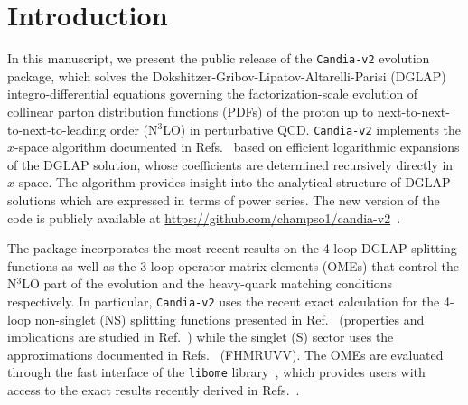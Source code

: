 \documentclass[preprint,12pt]{elsarticle}
\begin{document}
\pagebreak
\tableofcontents
\pagebreak


\section{Introduction}
\label{sec:intro}
In this manuscript, we present the public release of the \texttt{Candia-v2} evolution package, which solves the Dokshitzer-Gribov-Lipatov-Altarelli-Parisi (DGLAP)~\cite{Gribov:1972rt,Gribov:1972ri,Lipatov:1974qm,Dokshitzer:1977sg,Altarelli:1977zs} integro-differential equations governing the factorization-scale evolution of collinear parton distribution functions (PDFs) of the proton up to next-to-next-to-next-to-leading order (N$^3$LO) in perturbative QCD. 
%
\texttt{Candia-v2} implements the $x$-space algorithm documented in Refs.~\cite{Hampson:2025pvi,Cafarella:2005zj,Guzzi:2006wx,Cafarella:2008du} based on efficient logarithmic expansions of the DGLAP solution, whose coefficients are determined recursively directly in $x$-space. The algorithm provides insight into the analytical structure of DGLAP solutions which are expressed in terms of power series. The new version of the code is publicly available at \url{https://github.com/champso1/candia-v2}~\cite{candiav2}.

The package incorporates the most recent results on the 4-loop DGLAP splitting functions as well as the 3-loop operator matrix elements (OMEs) that control the N$^3$LO part of the evolution and the heavy-quark matching conditions respectively. In particular, \texttt{Candia-v2} uses the recent exact calculation for the 4-loop non-singlet (NS) splitting functions presented in Ref.~\cite{Gehrmann:2026qbl} (properties and implications are studied in Ref.~\cite{Moch:2026qsw}) while the singlet (S) sector uses the approximations documented in Refs.~\cite{Davies:2022ofz,Moch:2021qrk,Falcioni:2023luc,Falcioni:2023vqq,Moch:2023tdj,Falcioni:2024xyt,Falcioni:2024qpd,Falcioni:2025hfz} (FHMRUVV). The OMEs are evaluated through the fast interface of the \texttt{libome} library~\cite{Ablinger:2025joi}, which provides users with access to the exact results recently derived in Refs.~\cite{Ablinger:2025nnq,Ablinger:2025joi,Ablinger:2024qxg,Ablinger:2024xtt,Ablinger:2023ahe,Bierenbaum:2022biv,Ablinger:2022wbb,Behring:2021asx,Ablinger:2020snj,Ablinger:2019etw,Ablinger:2018brx,Ablinger:2017xml,Ablinger:2017err,Ablinger:2014tla,Ablinger:2014uka,Behring:2014eya,transitionAqg,Ablinger:2012qm,Blumlein:2012vq,Blumlein:2011mi,Ablinger:2010ty,Bierenbaum:2009zt,Bierenbaum:2008yu,Bierenbaum:2007qe,Bierenbaum:2007dm}.   
 
\end{document}
